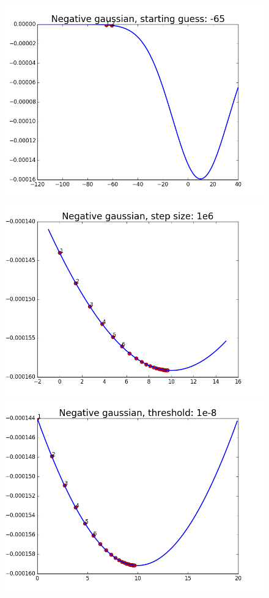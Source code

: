 \documentclass{article}
\begin{document}
\begin{figure}[width=\linewidth]
\centering
\begin{multicols}{2}
  \includegraphics[width=1.2\linewidth]{code/P1/bad_guess.png}
  \includegraphics[width=1.2\linewidth]{code/P1/negative_gaussian,stepsize1e6.png}
  \includegraphics[width=1.2\linewidth]{code/P1/negative_gaussian,threshold1e-8.png}

\end{multicols}
\end{figure}
\end{document}
